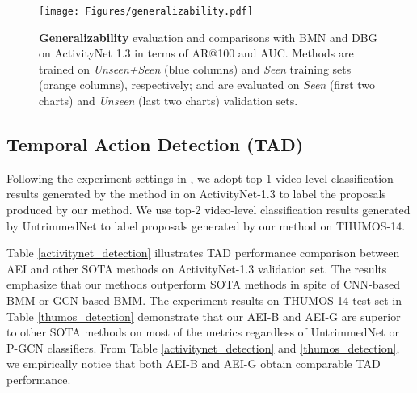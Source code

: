 \documentclass{bmvc2k}
\begin{document}
\begin{figure}[t]
  \centering
  \texttt{[image: Figures/generalizability.pdf]}
  \vspace*{-0.1cm}
  \caption{\textbf{Generalizability} evaluation and comparisons with BMN \cite{bmn} and DBG \cite{dbg} on ActivityNet 1.3 in terms of AR@100 and AUC. Methods are trained on \textit{Unseen+Seen} (blue columns) and \textit{Seen} training sets (orange columns), respectively; and are evaluated on \textit{Seen} (first two charts) and \textit{Unseen} (last two charts) validation sets.}
  \label{fig:Generalizability}
  \vspace*{-0.4cm}
\end{figure}










\subsection{Temporal Action Detection (TAD)}

Following the experiment settings in \cite{lin2018bsn, bmn, xu2020gtad}, we adopt top-1 video-level classification results generated by the method in \cite{action_protocol} on ActivityNet-1.3 to label the proposals produced by our method. We use top-2 video-level classification results generated by UntrimmedNet \cite{untrimmetNet} to label proposals generated by our method on THUMOS-14.

Table \ref{activitynet_detection} illustrates TAD performance comparison between AEI and other SOTA methods on ActivityNet-1.3 validation set. The results emphasize that our methods outperform SOTA methods in spite of CNN-based BMM or GCN-based BMM. The experiment results on THUMOS-14 test set in Table \ref{thumos_detection} demonstrate that our AEI-B and AEI-G are superior to other SOTA methods on most of the metrics regardless of UntrimmedNet \cite{untrimmetNet} or P-GCN \cite{pgcn_cvpr2020} classifiers. From Table \ref{activitynet_detection} and \ref{thumos_detection}, we empirically notice that both AEI-B and AEI-G obtain comparable TAD performance.
\end{document}
